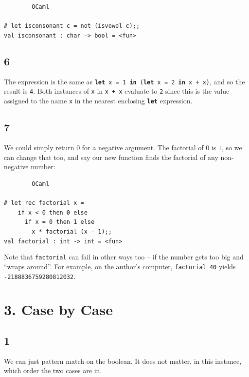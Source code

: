 \documentclass[]{book}
\newcommand{\smspace}{\vspace{4mm}}
\begin{document}
\smspace
\noindent\verb!        OCaml!\\
\noindent\\
\noindent\verb!# let isconsonant c = not (isvowel c);;!\\
\noindent\verb!val isconsonant : char -> bool = <fun>!

\subsection*{6}
The expression is the same as \textbf{\texttt{let}}\texttt{ x = 1 }\textbf{\texttt{in}}\texttt{ (}\textbf{\texttt{let}}\texttt{ x = 2 }\textbf{\texttt{in}}\texttt{ x + x)}, and so the result is \texttt{4}. Both instances of \texttt{x} in \texttt{x + x} evaluate to \texttt{2} since this is the value assigned to the name \texttt{x} in the nearest enclosing \textbf{\texttt{let}} expression.

\subsection*{7}
We could simply return $0$ for a negative argument. The factorial of $0$ is $1$, so we can change that too, and say our new function finds the factorial of any non-negative number:

\smspace
\noindent\verb!        OCaml!\\
\noindent\\
\noindent\verb!# let rec factorial x =!\\
\noindent\verb!    if x < 0 then 0 else!\\
\noindent\verb!      if x = 0 then 1 else!\\
\noindent\verb!        x * factorial (x - 1);;!\\
\noindent\verb!val factorial : int -> int = <fun>!
\smspace

\noindent Note that \texttt{factorial} can fail in other ways too -- if the number gets too big and ``wraps around''. For example, on the author's computer, \texttt{factorial 40} yields \texttt{-2188836759280812032}.

\section*{3. Case by Case}
\subsection*{1}

We can just pattern match on the boolean. It does not matter, in this instance, which order the two cases are in.
\end{document}

